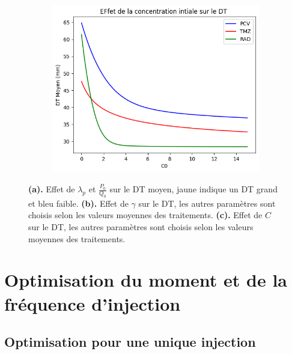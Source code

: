 \documentclass[12pt]{article}
\begin{document}
\begin{figure}
\begin{subfigure}[t]{0.45\textwidth}
        \centering
        \includegraphics[width=\linewidth]{Image/effet_C.png} 
        \caption{} \label{fig:effet_C}
    \end{subfigure}

    \caption{\textbf{(a).} Effet de $\lambda_{p}$ et $\frac{P_{0}}{Q_{0}}$ sur le DT moyen, jaune indique un DT grand et bleu faible. \textbf{(b).} Effet de $\gamma$ sur le DT, les autres paramètres sont choisis selon les valeurs moyennes des traitements. \textbf{(c).} Effet de $C$ sur le DT, les autres paramètres sont choisis selon les valeurs moyennes des traitements.}

\end{figure}

\section{Optimisation du moment et de la fréquence d'injection}
\subsection{Optimisation pour une unique injection}
\end{document}
